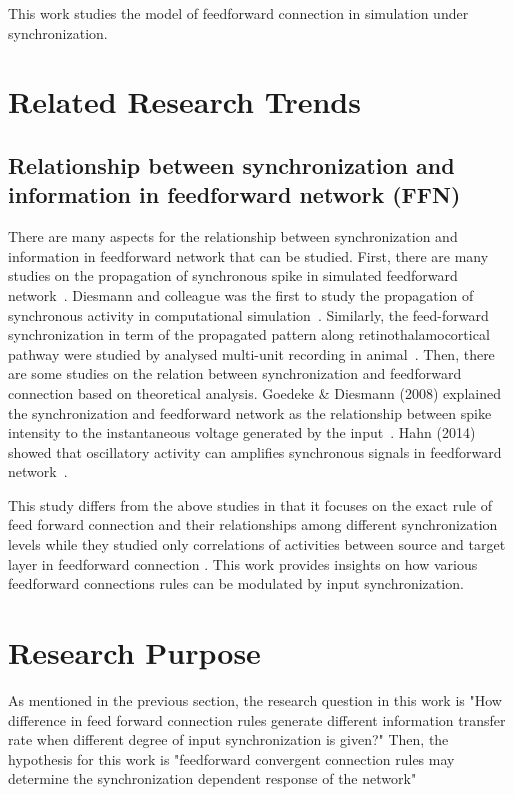 This work studies the model of feedforward connection in simulation under synchronization.

\section{Related Research Trends}
\subsection{Relationship between synchronization and information in feedforward network (FFN)}

There are many aspects for the relationship between synchronization and information in feedforward network that can be studied. First, there are many studies on the propagation of synchronous spike in simulated feedforward network~\cite{diesmann1999stable, kumar2008conditions,abeles2004modeling}. Diesmann and colleague was the first to study the propagation of synchronous activity in computational simulation~\cite{diesmann1999stable}. Similarly, the feed-forward synchronization in term of the propagated pattern along retinothalamocortical pathway were studied by analysed multi-unit recording in animal~\cite{neuenschwander2002feed}.
Then, there are some studies on the relation between synchronization and feedforward connection based on theoretical analysis.  Goedeke \& Diesmann (2008) explained the synchronization and feedforward network as the relationship between spike intensity to the instantaneous voltage generated by the input~\cite{goedeke2008mechanism}.  
Hahn (2014) showed that oscillatory activity can amplifies synchronous signals in feedforward network~\cite{hahn2014communication}.

This study differs from the above studies in that it focuses on the exact rule of feed forward connection and their relationships among different synchronization levels while they studied only correlations of activities between source and target layer in feedforward connection . This work provides insights on how various feedforward connections rules can be modulated by input synchronization.


\section{Research Purpose}
As mentioned in the previous section, the research question in this work is "How difference in feed forward connection rules generate different information transfer rate when different degree of input synchronization is given?"
Then, the hypothesis for this work is "feedforward convergent connection rules may determine the synchronization dependent response of the network"
